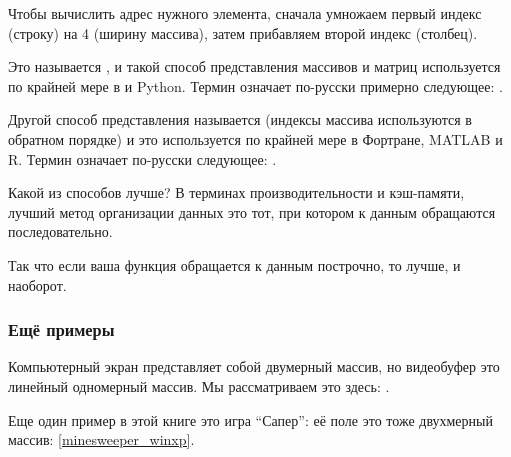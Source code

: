 Чтобы вычислить адрес нужного элемента, сначала умножаем первый индекс (строку) на 4 (ширину массива), 
затем прибавляем второй индекс (столбец).

Это называется , 
и такой способ представления массивов и матриц используется по крайней мере в \CCpp и Python. 
Термин  означает по-русски примерно следующее: .

Другой способ представления называется  (индексы массива используются в обратном порядке) 
и это используется по крайней мере в Фортране, MATLAB и R. 
Термин  означает по-русски
следующее: .

Какой из способов лучше?
В терминах производительности и кэш-памяти, лучший метод организации данных это тот,
при котором к данным обращаются последовательно.

Так что если ваша функция обращается к данным построчно, то  лучше,
и наоборот.





\subsubsection{Ещё примеры}

Компьютерный экран представляет собой двумерный массив, но видеобуфер это линейный
одномерный массив. 
Мы рассматриваем это здесь: .

Еще один пример в этой книге это игра ``Сапер'': её поле это тоже двухмерный массив: \ref{minesweeper_winxp}.

